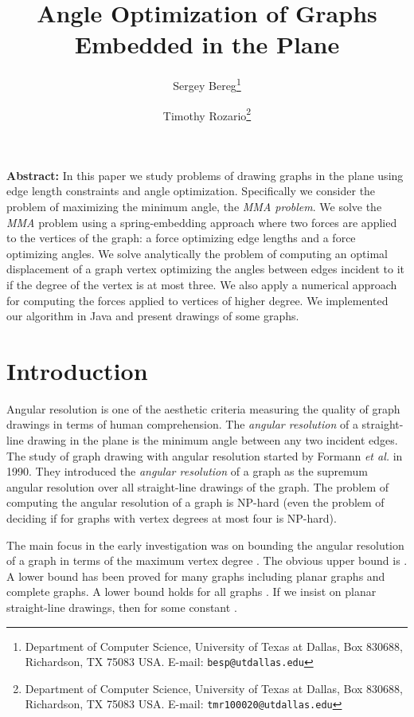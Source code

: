 \documentclass[10pt]{article}
\title{Angle Optimization of Graphs Embedded in the Plane}
\author{Sergey Bereg\thanks{
Department of Computer Science,
University of Texas at Dallas,
Box 830688,
Richardson, TX 75083
USA. E-mail: {\tt besp@utdallas.edu}
}
\and
Timothy Rozario\thanks{
Department of Computer Science,
University of Texas at Dallas,
Box 830688,
Richardson, TX 75083
USA. E-mail: {\tt tmr100020@utdallas.edu}
}
}
\date{}
\newcommand{\etal}{\textit{et al.}}
\begin{document}
\maketitle



{\bf Abstract:}
In this paper we study problems of drawing graphs in the plane using 
edge length constraints and angle optimization. Specifically we consider the problem of  
maximizing the minimum angle, the {\em MMA problem}. 
We solve the {\em MMA} problem using a spring-embedding approach where two forces are applied to the vertices of the graph: a force optimizing edge lengths and a force optimizing angles. We solve analytically the problem of computing an optimal displacement of a graph vertex optimizing the angles between edges incident to it if the degree of the vertex is at most three. We also apply a numerical approach for  computing the forces applied to vertices of higher degree. We implemented our algorithm in Java and present drawings of some graphs.



\section{Introduction}

Angular resolution is one of the aesthetic criteria measuring the quality of graph drawings in terms of human comprehension. 
The {\em angular resolution} of a straight-line drawing in the plane is the minimum angle between any two incident edges.    
The study of graph drawing with angular resolution started by Formann \etal \cite{formann93} 
in 1990. They introduced the {\em angular resolution} of a graph as the supremum angular resolution over all straight-line drawings of the graph. The problem of computing the angular resolution of a graph is NP-hard (even the problem of deciding if  for graphs with vertex degrees at most four is NP-hard).   

The main focus in the early investigation \cite{formann93,mp-arpg-94} was on bounding the angular resolution of a graph in terms of the maximum vertex degree . The obvious upper bound is . A lower bound  has been proved \cite{formann93}  for many graphs including planar graphs and complete graphs. 
A lower bound  holds for all graphs \cite{formann93}.
If we insist on planar straight-line drawings, then   for some constant  \cite{mp-arpg-94}. 
\end{document}

